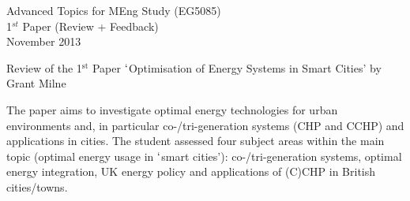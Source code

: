 \documentclass[14pt,twoside]{report}
\begin{document}
\clearpage


\begin{center}
\Huge{Advanced Topics for MEng Study (EG5085)}\\
\huge{1$^{st}$ Paper (Review + Feedback)}\\
\huge{November 2013}
\end{center}

\vfill

\clearpage



\bigskip

\begin{center}
{\Large Review of the 1$^{\text{st}}$ Paper $\lq$Optimisation of Energy Systems in Smart Cities' by Grant Milne}
\end{center}

\medskip

The paper aims to investigate optimal energy technologies for urban environments and, in particular co-/tri-generation systems (CHP and CCHP) and applications in cities. The student assessed four subject areas within the main topic (optimal energy usage in $\lq$smart cities'): co-/tri-generation systems, optimal energy integration, UK energy policy and applications of (C)CHP in British cities/towns.
\end{document}
